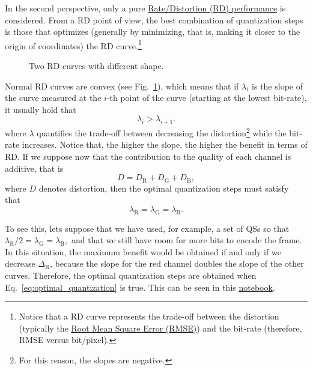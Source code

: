 In the second perspective, only a pure
\href{https://en.wikipedia.org/wiki/Rate-distortion_theory}{Rate/Distortion
  (RD) performance} is considered. From a RD point of view, the best
combination of quantization steps is those that optimizes (generally
by minimizing, that is, making it closer to the origin of coordinates)
the RD curve.\footnote{Notice that a RD curve represents the trade-off
between the distortion (typically the
\href{https://en.wikipedia.org/wiki/Root-mean-square_deviation}{Root
  Mean Square Error (RMSE)}) and the bit-rate (therefore, RMSE versus
bit/pixel).}

\begin{figure}
  \centering
  \caption{Two RD curves with different shape.}
  \label{fig:RD_slopes}
\end{figure}

Normal RD curves are convex (see Fig.~\ref{fig:RD_slopes}), which
means that if $\lambda_i$ is the slope of the curve measured at the
$i$-th point of the curve (starting at the lowest bit-rate), it
usually hold that
\begin{equation}
  \lambda_i > \lambda_{i+1}.
\end{equation}
where $\lambda$ quantifies the trade-off between decreasing the
distortion\footnote{For this reason, the slopes are negative.} while
the bit-rate increases. Notice that, the higher the slope, the higher
the benefit in terms of RD. If we suppose now that the contribution to
the quality of each channel is additive, that is
\begin{equation}
  D = D_{\text{R}} + D_{\text{G}} + D_{\text{B}},
  \label{eq:additive}
\end{equation}
where $D$ denotes distortion, then the optimal quantization steps must
satisfy that~\cite{vetterli1995wavelets,sayood2017introduction}
\begin{equation}
  \lambda_{\text{R}} = \lambda_{\text{G}} = \lambda_{\text{B}}.
  \label{eq:optimal_quantization}
\end{equation}

To see this, lets suppose that we have used, for example, a set of QSs
so that $\lambda_{\text{R}}/2 = \lambda_{\text{G}} =
\lambda_{\text{B}},$ and that we still have room for more bits to
encode the frame. In this situation, the maximum benefit would be
obtained if and only if we decrease $\Delta_{\text{R}}$, because the
slope for the red channel doubles the slope of the other
curves. Therefore, the optimal quantization steps are obtained when
Eq.~\ref{eq:optimal_quantization} is true. This can be seen in this
\href{https://github.com/Sistemas-Multimedia/Sistemas-Multimedia.github.io/blob/master/milestones/05-RGB_compression/RGB_compression.ipynb}{notebook}.

